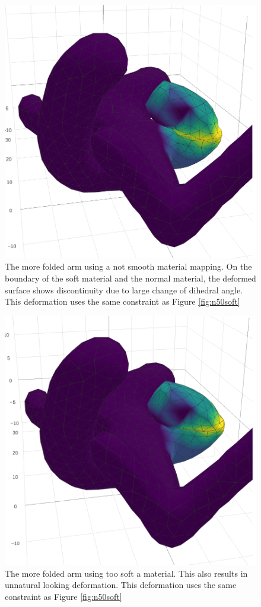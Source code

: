 \documentclass{6838publ}
\begin{document}
\begin{figure}[t!]  \centering
  \includegraphics[width=.6\linewidth]{discontinuous}
  \caption{The more folded arm using a not smooth material mapping. On
the boundary of the soft material and the normal material, the
deformed surface shows discontinuity due to large change of dihedral
angle. This deformation uses the same constraint as Figure
\ref{fig:n50soft}}
  \label{fig:step_mapping}
\end{figure}
\begin{figure}[t!]  \centering
  \includegraphics[width=.6\linewidth]{too_soft}
  \caption{The more folded arm using too soft a material. This also
results in unnatural looking deformation. This deformation uses the
same constraint as Figure \ref{fig:n50soft}}
  \label{fig:low_weight}
\end{figure}
\end{document}

